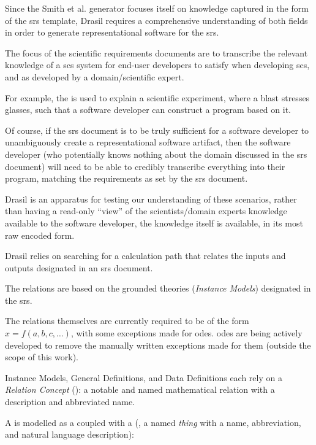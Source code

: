 Since the Smith et al. generator focuses itself on knowledge captured in the
form of the \acs{srs} template, Drasil requires a comprehensive understanding of
both fields in order to generate representational software for the \acs{srs}.

The focus of the scientific requirements documents are to transcribe the
relevant knowledge of a \acs{scs} system for end-user developers to satisfy when
developing \acs{scs}, and as developed by a domain/scientific expert.

For example, the 
is used to explain a scientific experiment, where a blast stresses glasses, such
that a software developer can construct a program based on it.

Of course, if the \acs{srs} document is to be truly sufficient for a software
developer to unambiguously create a representational software artifact, then the
software developer (who potentially knows nothing about the domain discussed in
the \acs{srs} document) will need to be able to credibly transcribe everything
into their program, matching the requirements as set by the \acs{srs} document.

Drasil is an apparatus for testing our understanding of these scenarios, rather
than having a read-only ``view'' of the scientists/domain experts knowledge
available to the software developer, the knowledge itself is available, in its
most raw encoded form.




Drasil relies on searching for a calculation path that relates the inputs and
outputs designated in an \acs{srs} document.

The relations are based on the grounded theories (\textit{Instance Models})
designated in the \acs{srs}.

The relations themselves are currently required to be of the form \(x = f(a, b,
c, \ldots{})\), with some exceptions made for \acsp{ode}. \acsp{ode} are being
actively developed to remove the manually written exceptions made for them
(outside the scope of this work).




Instance Models, General Definitions, and Data Definitions each rely on a
\textit{Relation Concept} (\RelationConcept{}): a notable and named mathematical
relation with a description and abbreviated name.

A \RelationConcept{} is modelled as a \Relation{} coupled with a \ConceptChunk{}
(, a named \textit{thing} with a name,
abbreviation, and natural language description):

